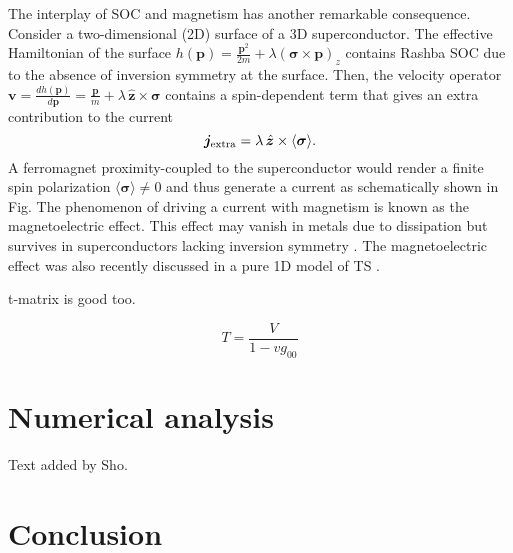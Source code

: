 \documentclass[twocolumn,showpacs,floatfix,nofootinbib,longbibliography]{revtex4-1}
\begin{document}
The interplay of SOC and magnetism has another remarkable consequence. Consider a two-dimensional (2D) surface of a 3D superconductor. The effective Hamiltonian of the surface $h(\bm p) = \frac{{\bm p}^2}{2m} + \lambda\left( \bm\sigma\times\bm p\right)_z$ contains Rashba SOC due to the absence of inversion symmetry at the surface. Then, the velocity operator $\bm v= {\frac{dh(\bm p)}{d\bm p} =\frac{\bm p}{m}+ \lambda \,\hat{\bm z}\times\bm\sigma}$ contains a spin-dependent term that gives an extra contribution to the current
\begin{equation}
	\bm j_{\rm extra} = \lambda\,  \hat{\bm z}\times\langle\bm\sigma\rangle . \label{main}
\end{equation}
A ferromagnet proximity-coupled to the superconductor would render a finite spin polarization $\langle \bm \sigma \rangle \neq 0$ and thus generate a current as schematically shown in Fig. The phenomenon of driving a current with magnetism is known as the magnetoelectric effect. This effect may vanish in metals due to dissipation but survives in superconductors lacking inversion symmetry \cite{Levitov1985, Edelstein1989, Edelstein1995, Yip2001, BauerSigrist2012}. The magnetoelectric effect was also recently discussed in a pure 1D model of TS \cite{Ojanen2012}. 

t-matrix is good too.

\begin{equation}
 T = \frac{V}{1-vg_{00}}
\end{equation}

\section{Numerical analysis} \label{sec:numerics}
Text added by Sho.


\section{Conclusion} \label{sec:conclusion}




\newpage
%

\end{document}
